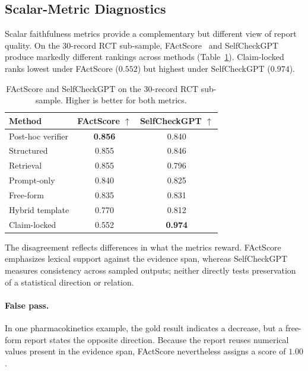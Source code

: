 \documentclass[10pt,twocolumn]{article}
\begin{document}
\subsection{Scalar-Metric Diagnostics}
\label{sec:scalar}

Scalar faithfulness metrics provide a complementary but different view of report quality. On the $30$-record RCT sub-sample, FActScore~\citep{ref_factscore} and SelfCheckGPT~\citep{ref_self_check} produce markedly different rankings across methods (Table~\ref{tab:scalar-metrics}). Claim-locked ranks lowest under FActScore ($0.552$) but highest under SelfCheckGPT ($0.974$).

\begin{table}[t]
	\centering
	\footnotesize
	\setlength{\tabcolsep}{6pt}
	\caption{FActScore and SelfCheckGPT on the $30$-record RCT sub-sample. Higher is better for both metrics.}
	\label{tab:scalar-metrics}
	\begin{tabular}{lcc}
		\toprule
		Method & FActScore $\uparrow$ & SelfCheckGPT $\uparrow$ \\
		\midrule
		Post-hoc verifier & \textbf{0.856} & 0.840 \\
		Structured        & 0.855 & 0.846 \\
		Retrieval         & 0.855 & 0.796 \\
		Prompt-only       & 0.840 & 0.825 \\
		Free-form         & 0.835 & 0.831 \\
		Hybrid template   & 0.770 & 0.812 \\
		Claim-locked      & 0.552 & \textbf{0.974} \\
		\bottomrule
	\end{tabular}
\end{table}

The disagreement reflects differences in what the metrics reward. FActScore emphasizes lexical support against the evidence span, whereas SelfCheckGPT measures consistency across sampled outputs; neither directly tests preservation of a statistical direction or relation.

\paragraph{False pass.} In one pharmacokinetics example, the gold result indicates a decrease, but a free-form report states the opposite direction. Because the report reuses numerical values present in the evidence span, FActScore nevertheless assigns a score of $1.00$.
\end{document}
